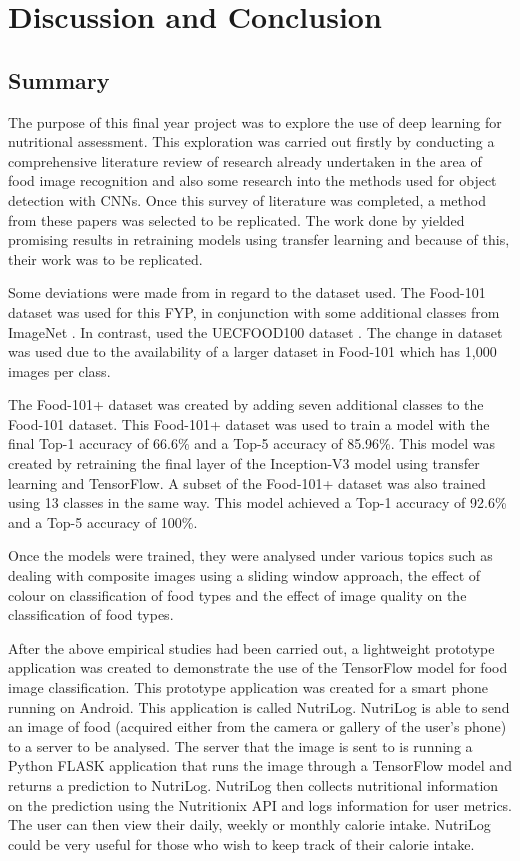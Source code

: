 \chapter{Discussion and Conclusion}
\section{Summary}
The purpose of this final year project was to explore the use of deep learning for nutritional assessment.
This exploration was carried out firstly by conducting a comprehensive literature review of research already undertaken in the area of food image recognition and also some research into the methods used for object detection with CNNs.
Once this survey of literature was completed, a method from these papers was selected to be replicated.
The work done by \parencite{yanaiFood} yielded promising results in retraining models using transfer learning and because of this, their work was to be replicated.

Some deviations were made from \parencite{yanaiFood} in regard to the dataset used.
The Food-101 dataset was used for this FYP, in conjunction with some additional classes from ImageNet \parencite{imagenet}.
In contrast, \parencite{yanaiFood} used the UECFOOD100 dataset \parencite{uecFood}.
The change in dataset was used due to the availability of a larger dataset in Food-101 which has 1,000 images per class.

The Food-101+ dataset was created by adding seven additional classes to the Food-101 dataset.
This Food-101+ dataset was used to train a model with the final Top-1 accuracy of 66.6\% and a Top-5 accuracy of  85.96\%.
This model was created by retraining the final layer of the Inception-V3 \parencite{rethinkingInception} model using transfer learning and TensorFlow.
A subset of the Food-101+ dataset was also trained using 13 classes in the same way.
This model achieved a Top-1 accuracy of 92.6\% and a Top-5 accuracy of 100\%.

Once the models were trained, they were analysed under various topics such as
dealing with composite images using a sliding window approach, the effect of colour on classification of food types and the effect of image quality on the classification of food types.

After the above empirical studies had been carried out, a lightweight prototype application was created to demonstrate the use of the TensorFlow model for food image classification.
This prototype application was created for a smart phone running on Android.
This application is called NutriLog.
NutriLog is able to send an image of food (acquired either from the camera or gallery of the user's phone) to a server to be analysed.
The server that the image is sent to is running a Python FLASK application that runs the image through a TensorFlow model and returns a prediction to NutriLog.
NutriLog then collects nutritional information on the prediction using the Nutritionix API and logs information for user metrics.
The user can then view their daily, weekly or monthly calorie intake.
NutriLog could be very useful for those who wish to keep track of their calorie intake.

